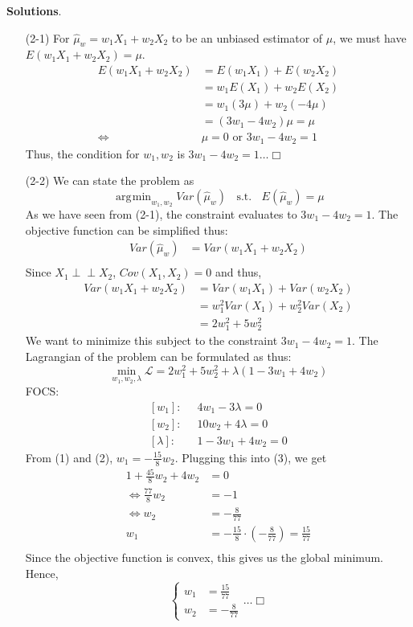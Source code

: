 \documentclass[
]{article}
\begin{document}
\textbf{Solutions}.\\

\begin{itemize}
\item[(2-1)]
For $\widehat{\mu}_{w}=w_{1} X_{1}+w_{2} X_{2}$ to be an unbiased estimator of $\mu$, we must have $E(w_{1} X_{1}+w_{2} X_{2}) = \mu$. 
$$\begin{aligned}
E(w_{1} X_{1}+w_{2} X_{2}) &= E(w_{1} X_{1}) + E(w_{2} X_{2}) \\
&= w_1 E(X_1) + w_2 E(X_2) \\
&= w_1 (3\mu)  + w_2 (-4\mu) \\
&= (3w_1 - 4 w_2) \mu = \mu \\
\iff &\mu = 0 \text { or } 3w_1 - 4w_2 = 1
\end{aligned}$$
Thus, the condition for $w_1, w_2$ is $3w_1 - 4w_2 = 1 \dots \Box$

\item[(2-2)] We can state the problem as 
$$\mathop{\mathrm{arg\!min}}_{w_1,w_2} Var(\widehat{\mu}_w)\;\; \text{ s.t. }\;\; E(\widehat{\mu}_w) = \mu$$
As we have seen from (2-1), the constraint evaluates to $3w_1 - 4w_2 = 1$. 
The objective function can be simplified thus: 
$$\begin{aligned}
Var(\widehat{\mu}_w) &= Var(w_1X_1 + w_2X_2) \\
\end{aligned}$$
Since $X_1 \perp\!\!\!\perp X_2$, $Cov(X_1, X_2) = 0$ and thus, 
$$\begin{aligned}
Var(w_1X_1 + w_2X_2) &= Var(w_1X_1) + Var(w_2X_2) \\
&= w_1 ^2 Var(X_1) + w_2 ^2 Var(X_2) \\
&= 2w_1^2 + 5w_2^2
\end{aligned}$$
We want to minimize this subject to the constraint $3w_1 - 4w_2 = 1$. The Lagrangian of the problem can be formulated as thus:
$$\min_{w_1,w_2,\lambda}\mathcal{L} = 2w_1^2 + 5w_2^2 + \lambda(1-3w_1 + 4w_2)$$
FOCS:
\begin{align}
\left[w_1\right]:&\;\; 4w_1 - 3\lambda = 0 \\
\left[w_2\right]:&\;\; 10w_2 + 4 \lambda = 0  \\
\left[\lambda\right]:&\;\; 1-3w_1 + 4w_2 = 0
\end{align}
From (1) and (2), $w_1 = -\frac{15}{8}w_2$. Plugging this into (3), we get 
$$\begin{aligned}1 + \frac{45}{8}w_2 + 4w_2 &= 0 \\
 \iff\frac{77}{8}w_2 &= -1 \\
 \iff w_2 &= -\frac{8}{77} \\
 w_1 &= -\frac{15}{8}\cdot \left(-\frac{8}{77}\right) = \frac{15}{77} \\
\end{aligned}$$
Since the objective function is convex, this gives us the global minimum. Hence, 
$$\begin{cases}
w_1 &=\frac{15}{77} \\
w_2 &= -\frac{8}{77}
\end{cases} \dots \Box$$

\end{itemize}
\end{document}
